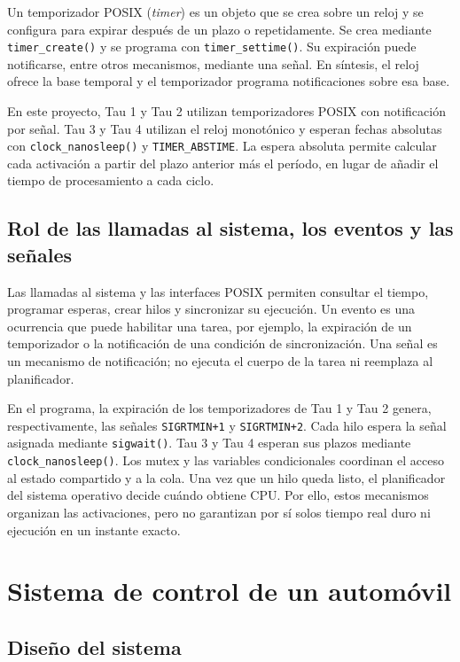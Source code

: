 \documentclass[12pt,a4paper]{article}
\begin{document}
Un temporizador POSIX (\textit{timer}) es un objeto que se crea sobre un reloj y se configura para expirar después de un plazo o repetidamente. Se crea mediante \texttt{timer\_create()} y se programa con \texttt{timer\_settime()}. Su expiración puede notificarse, entre otros mecanismos, mediante una señal. En síntesis, el reloj ofrece la base temporal y el temporizador programa notificaciones sobre esa base.

En este proyecto, Tau 1 y Tau 2 utilizan temporizadores POSIX con notificación por señal. Tau 3 y Tau 4 utilizan el reloj monotónico y esperan fechas absolutas con \texttt{clock\_nanosleep()} y \texttt{TIMER\_ABSTIME}. La espera absoluta permite calcular cada activación a partir del plazo anterior más el período, en lugar de añadir el tiempo de procesamiento a cada ciclo.

\subsection{Rol de las llamadas al sistema, los eventos y las señales}

Las llamadas al sistema y las interfaces POSIX permiten consultar el tiempo, programar esperas, crear hilos y sincronizar su ejecución. Un evento es una ocurrencia que puede habilitar una tarea, por ejemplo, la expiración de un temporizador o la notificación de una condición de sincronización. Una señal es un mecanismo de notificación; no ejecuta el cuerpo de la tarea ni reemplaza al planificador.

En el programa, la expiración de los temporizadores de Tau 1 y Tau 2 genera, respectivamente, las señales \texttt{SIGRTMIN+1} y \texttt{SIGRTMIN+2}. Cada hilo espera la señal asignada mediante \texttt{sigwait()}. Tau 3 y Tau 4 esperan sus plazos mediante \texttt{clock\_nanosleep()}. Los mutex y las variables condicionales coordinan el acceso al estado compartido y a la cola. Una vez que un hilo queda listo, el planificador del sistema operativo decide cuándo obtiene CPU. Por ello, estos mecanismos organizan las activaciones, pero no garantizan por sí solos tiempo real duro ni ejecución en un instante exacto.

\section{Sistema de control de un automóvil}

\subsection{Diseño del sistema}
\end{document}
